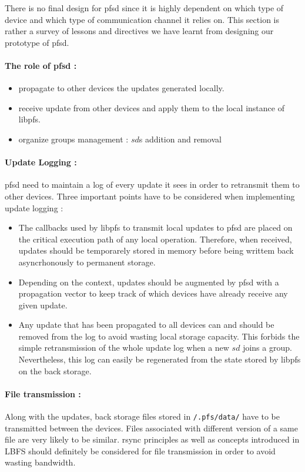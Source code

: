 There is no final design for pfsd since it is highly dependent on which
type of device and which type of communication channel it relies on. This
section is rather a survey of lessons and directives we have learnt
from designing our prototype of pfsd. 

\paragraph {The role of pfsd :}
\begin{itemize}
\item propagate to other devices the updates generated locally.
\item receive update from other devices and apply them to the local
  instance of libpfs.
\item organize groups management : $sd$s addition and removal
\end{itemize}

\paragraph {Update Logging :}
pfsd need to maintain a log of every update it sees in order to
retransmit them to other devices. Three important points have to be
considered when implementing update logging :
\begin{itemize}
\item The callbacks used by libpfs to transmit local updates to pfsd are
  placed on the critical execution path of any local
  operation. Therefore, when received, updates should be temporarely
  stored in memory before being writtem back asyncrhonously to permanent
  storage.
\item Depending on the context, updates should be augmented by pfsd
  with a propagation vector to keep track of which devices have
  already receive any given update.
\item Any update that has been propagated to all devices can and
  should be removed from the log to avoid wasting local storage
  capacity. This forbids the simple retransmission of the whole update
  log when a new $sd$ joins a group. Nevertheless, this log can easily
  be regenerated from the state stored by libpfs on the back storage.
\end{itemize}

\paragraph {File transmission :}
Along with the updates, back storage files stored in {\tt /.pfs/data/}
have to be transmitted between the devices. Files associated with
different version of a same file are very likely to be
similar. rsync\cite{tridgell:rsync} principles as well as concepts
introduced in LBFS\cite{muthitacharoen:lbfs} should definitely be
considered for file transmission in order to avoid wasting bandwidth.

